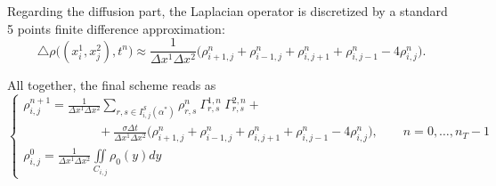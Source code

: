 \documentclass{cmslatex}
\newcommand{\alphastar}{\alpha^*}
\renewcommand{\r}{\rho}
\newcommand{\Dx}{\Delta x^1}
\newcommand{\Dy}{\Delta x^2}
\newcommand{\Dt}{\Delta t}
\begin{document}
Regarding the diffusion part, the Laplacian operator is discretized by a standard 5 points finite difference approximation:
$$
\triangle\rho\big((x^1_i,x^2_j),t^n\big)\approx
\frac{1}{\Dx\Dy} \big(\rho^{n}_{i+1,j}+\rho^{n}_{i-1,j}+\rho^{n}_{i,j+1}+\rho^{n}_{i,j-1}-4\rho^{n}_{i,j}\big).
$$

All together, the final scheme reads as
\begin{equation}\label{schema_push_forward_implementato_CI}
\left\{
\begin{array}{l}
\displaystyle
\r^{n+1}_{i,j} =\frac{1}{\Dx\Dy} \sum\limits_{r,s\in I^\mathcal S_{i,j}(\alphastar)} \r^{n}_{r,s} \ \Gamma_{r,s}^{1,n} \ \Gamma_{r,s}^{2,n}  +\\ [7mm] \qquad\qquad\qquad
+\frac{\sigma\Dt}{\Dx\Dy} \big(\rho^{n}_{i+1,j}+\rho^{n}_{i-1,j}+\rho^{n}_{i,j+1}+\rho^{n}_{i,j-1}-4\rho^{n}_{i,j}\big),
\qquad n=0,\ldots,n_T-1 \\ [5mm]
\displaystyle
\r^0_{i,j} = \frac{1}{\Dx\Dy}\iint\limits_{C_{i,j}}\r_0(y)dy 
\end{array}
\right.
\end{equation}
\end{document}

